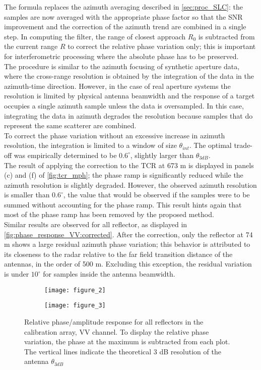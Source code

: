 The formula replaces the azimuth averaging described in \autoref{sec:proc_SLC}: the samples are now averaged with the appropriate phase factor so that the SNR improvement and the correction of the azimuth trend are combined in a single step. In computing the filter, the range of closest approach $R_{0}$ is subtracted from the current range $R$ to correct the relative phase variation only; this is important for interferometric processing where the absolute phase has to be preserved.\\
The procedure is similar to the azimuth focusing of synthetic aperture data, where the cross-range resolution is obtained by the integration of the data in the azimuth-time direction. However, in the case of real aperture systems the resolution is limited by physical antenna beamwidth and the response of a target  occupies a single azimuth sample unless the data is oversampled. In this case, integrating the data in azimuth degrades the resolution because samples that do represent the same scatterer are combined.\\ To correct the phase variation without an excessive increase in azimuth resolution, the integration is limited to a window of size $\theta_{int}$. The optimal trade-off was empirically determined to be $0.6^\circ$, slightly larger than $\theta_{3dB}$.\\
The result of applying the correction to the TCR at 673 m is displayed in panels (c) and (f) of \autoref{fig:tcr_mph}; the phase ramp is significantly reduced while the azimuth resolution is slightly degraded. However, the observed azimuth resolution is smaller than $0.6^\circ$, the value that would be observed if the samples were to be summed without accounting for the phase ramp. This result hints again that  most of the phase ramp has been removed by the proposed method.\\
Similar results are observed for all reflector, as displayed in 	\autoref{fig:phase_response_VV:corrected}.  After the correction, only the reflector at 74 m shows a large residual azimuth phase variation; this behavior is attributed to its closeness to the radar relative to the far field transition distance of the antennas, in the order of 500 m. Excluding this exception, the residual variation is under $10^\circ$ for samples inside the antenna beamwidth.
\begin{figure*}[ht]
	\begin{subfigure}[t]{\columnwidth}
		\texttt{[image: figure\_2]}
		\label{fig:phase_response_VV:uncorrected}
	\end{subfigure}
	\begin{subfigure}[t]{\columnwidth}
		\texttt{[image: figure\_3]}
		\label{fig:phase_response_VV:corrected}
	\end{subfigure}
	\caption{Relative phase/amplitude response for all reflectors in the calibration array, VV channel. To display the relative phase variation, the phase at the maximum is subtracted from each plot. The vertical lines indicate the theoretical 3 dB resolution of the antenna $\theta_{3dB}$}
	\label{fig:phase_response_VV}
\end{figure*}

